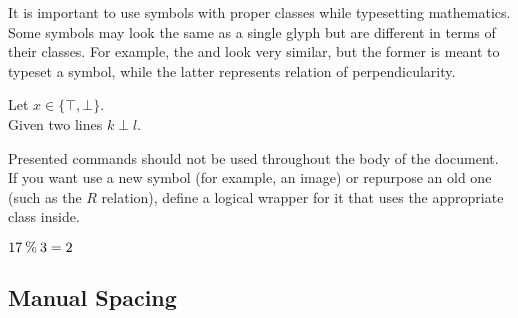 It is important to use symbols with proper classes while typesetting
mathematics. Some symbols may look the same as a single glyph but are different
in terms of their classes. For example, the  and  look very
similar, but the former is meant to typeset a symbol, while the latter
represents relation of perpendicularity.
\begin{example}
Let \(x \in \{\top, \bot\}\).
\\ %
Given two lines \(k \perp l\).
\end{example}

Presented commands should not be used throughout the body of the document. If
you want use a new symbol (for example, an image) or repurpose an old one (such
as the \(R\) relation), define a logical wrapper for it that uses the
appropriate class inside.
\begin{example}
\NewDocumentCommand{\modulo}{}{%
  \mathbin{\%}%
}
\( 17 \modulo 3 = 2 \)
\end{example}

\subsection{Manual Spacing}

